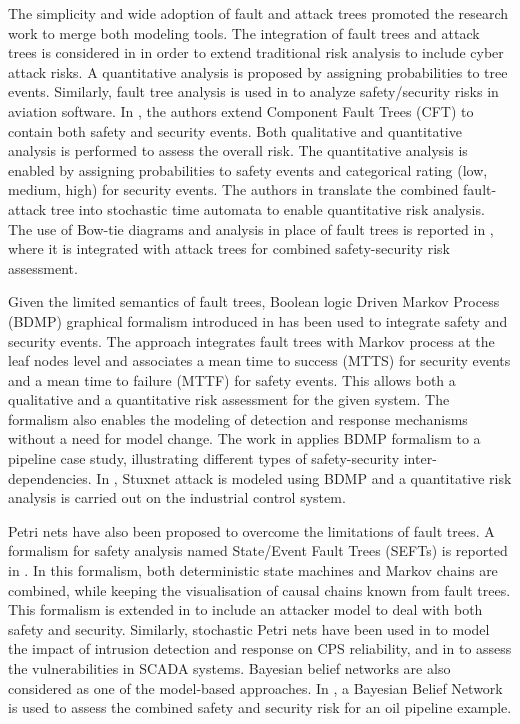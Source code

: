 \documentclass[journal]{IEEEtran}
\begin{document}
The simplicity and wide adoption of fault and attack trees promoted the research work to merge both modeling tools. The integration of fault trees and attack trees is considered in \cite{NaiFovino2009b} in order to extend traditional risk analysis to include cyber attack risks. A quantitative analysis is proposed by assigning probabilities to tree events. Similarly, fault tree analysis is used in \cite{Kornecki2013} to analyze safety/security risks in aviation software. In \cite{Steiner2013}, the authors extend Component Fault Trees (CFT) to contain both safety and security events. Both qualitative and quantitative analysis is performed to assess the overall risk. The quantitative analysis is enabled by assigning probabilities to safety events and categorical rating (low, medium, high) for security events. The authors in \cite{Kumar2017} translate the combined fault-attack tree into stochastic time automata to enable quantitative risk analysis. The use of Bow-tie diagrams and analysis in place of fault trees is reported in \cite{Abdo2018b}, where it is integrated with attack trees for combined safety-security risk assessment.

Given the limited semantics of fault trees, Boolean logic Driven Markov Process (BDMP) graphical formalism introduced in \cite{Bouissou2003} has been used to integrate safety and security events. The approach integrates fault trees with Markov process at the leaf nodes level and associates a mean time to success (MTTS) for security events and a mean time to failure (MTTF) for safety events. This allows both a qualitative and a quantitative risk assessment for the given system. The formalism also enables the modeling of detection and response mechanisms without a need for model change. The work in \cite{Kriaa2014} applies BDMP formalism to a pipeline case study, illustrating different types of safety-security inter-dependencies. In \cite{Kriaa2012a}, Stuxnet attack is modeled using BDMP and a quantitative risk analysis is carried out on the industrial control system.

Petri nets have also been proposed to overcome the limitations of fault trees. A formalism for safety analysis named State/Event Fault Trees (SEFTs) is reported in \cite{Kaiser2007}. In this formalism, both deterministic state machines and Markov chains are combined, while keeping the visualisation of causal chains known from fault trees. This formalism is extended in \cite{Roth2013} to include an attacker model to deal with both safety and security. Similarly, stochastic Petri nets have been used in \cite{Mitchell2013} to model the impact of intrusion detection and response on CPS reliability, and in \cite{Ten2008} to assess the vulnerabilities in SCADA systems. Bayesian belief networks are also considered as one of the model-based approaches. In \cite{Kornecki2013a}, a Bayesian Belief Network is used to assess the combined safety and security risk for an oil pipeline example.
\end{document}
